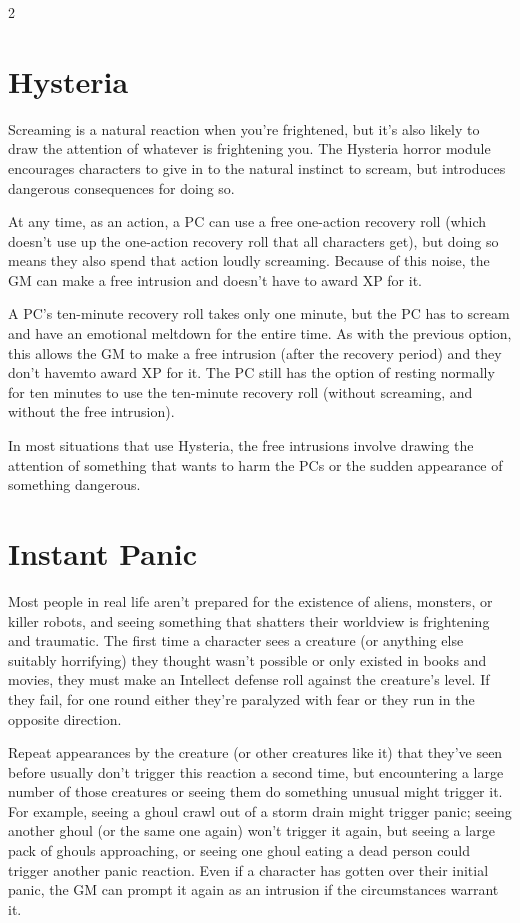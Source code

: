 \begin{multicols}{2}

\section{Hysteria}

Screaming is a natural reaction when you’re frightened, but it’s also likely to draw the attention of whatever is frightening you. The Hysteria horror module encourages characters to give in to the natural instinct to scream, but introduces dangerous consequences for doing so.

At any time, as an action, a PC can use a free one-action recovery roll (which doesn’t use up the one-action recovery roll that all characters get), but doing so means they also spend that action loudly screaming. Because of this noise, the GM can make a free intrusion and doesn’t have to award XP for it.

A PC’s ten-minute recovery roll takes only one minute, but the PC
has to scream and have an emotional meltdown for the entire time. As with the previous option, this allows the GM to make a free intrusion (after the recovery period) and they don’t havemto award XP for it. The PC still has the option of resting normally for ten minutes to use the ten-minute recovery roll (without screaming, and without the free intrusion).

In most situations that use Hysteria, the free intrusions involve drawing the attention of something that wants to harm the PCs or the sudden appearance of something dangerous.

\section{Instant Panic}

Most people in real life aren’t prepared for the existence of aliens, monsters, or killer robots, and seeing something that shatters their worldview is frightening and traumatic. The first time a character sees a creature (or anything else suitably horrifying) they thought wasn’t possible or only existed in books and movies, they must make an Intellect defense roll against the creature’s level. If they fail, for one round either they’re paralyzed with fear or they run in the opposite direction.

Repeat appearances by the creature (or other creatures like it) that they’ve seen before usually don’t trigger this reaction a second time, but encountering a large number of those creatures or seeing them do something unusual might trigger it. For example, seeing a ghoul crawl out of a storm drain might trigger panic; seeing another ghoul (or the same one again) won’t trigger it again, but seeing a large pack of ghouls approaching, or seeing one ghoul eating a dead person could trigger another panic reaction. Even if a character has gotten over their initial panic, the GM can prompt it again as an intrusion if the circumstances warrant it.


\end{multicols}
